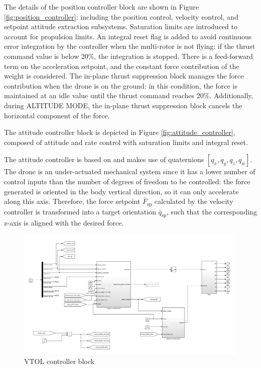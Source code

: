 The details of the position controller block are shown in Figure \ref{fig:position_controller}: including the position control, velocity control, and setpoint attitude extraction subsystems. Saturation limits are introduced to account for propulsion limits. An integral reset flag is added to avoid continuous error integration by the controller when the multi-rotor is not flying: if the thrust command value is below 20\%, the integration is stopped. There is a feed-forward term on the acceleration setpoint, and the constant force contribution of the weight is considered. The in-plane thrust suppression block manages the force contribution when the drone is on the ground: in this condition, the force is maintained at an idle value until the thrust command reaches 20\%. Additionally, during ALTITUDE MODE, the in-plane thrust suppression block cancels the horizontal component of the force.

The attitude controller block is depicted in Figure \ref{fig:attitude_controller}, composed of attitude and rate control with saturation limits and integral reset.

The attitude controller is based on \cite{brescianini2013nonlinear} and makes use of quaternions \([q_x, q_y, q_z, q_w]\). The drone is an under-actuated mechanical system since it has a lower number of control inputs than the number of degrees of freedom to be controlled: the force generated is oriented in the body vertical direction, so it can only accelerate along this axis. Therefore, the force setpoint \(\bar{F}_{\text{sp}}\) calculated by the velocity controller is transformed into a target orientation \(\bar{q}_{\text{sp}}\), such that the corresponding z-axis is aligned with the desired force.

\begin{figure}
  \centering
      \includegraphics[width=1\linewidth]{Images/VTOL_controller.png}
      \caption{VTOL controller block}
      \label{fig:VTOL_controller}
\end{figure}

